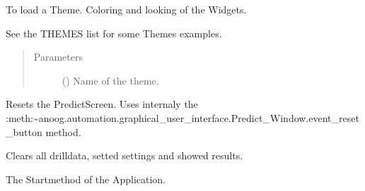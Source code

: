 \documentclass[letterpaper,10pt,english]{sphinxmanual}
\begin{document}
\begin{fulllineitems}
\begin{fulllineitems}
\end{fulllineitems}


\begin{fulllineitems}
\label{\detokenize{anoog.automation:anoog.automation.graphical_user_interface.GUI_App.load_theme}}
\sphinxAtStartPar
To load a Theme. Coloring and looking of the Widgets.

\sphinxAtStartPar
See the THEMES list for some Themes examples.
\begin{quote}\begin{description}
\item[{Parameters}] \leavevmode
\sphinxAtStartPar
{} () \textendash{} Name of the theme.

\end{description}\end{quote}

\end{fulllineitems}


\begin{fulllineitems}
\label{\detokenize{anoog.automation:anoog.automation.graphical_user_interface.GUI_App.reset_predict}}
\sphinxAtStartPar
Resets the Predict\sphinxhyphen{}Screen. Uses internaly the :meth:\textasciitilde{}anoog.automation.graphical\_user\_interface.Predict\_Window.event\_reset\_button method.

\sphinxAtStartPar
Clears all drill\sphinxhyphen{}data, setted settings and showed results.

\end{fulllineitems}


\begin{fulllineitems}
\label{\detokenize{anoog.automation:anoog.automation.graphical_user_interface.GUI_App.run}}
\sphinxAtStartPar
The Startmethod of the Application.


\end{fulllineitems}
\end{fulllineitems}
\end{document}
